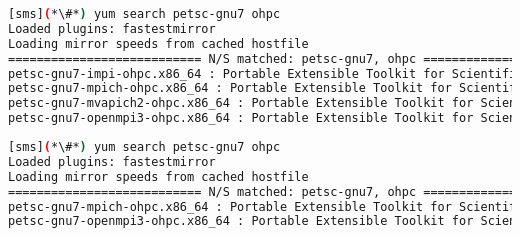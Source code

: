 \begin{lstlisting}[language=bash,keywords={}]
[sms](*\#*) yum search petsc-gnu7 ohpc
Loaded plugins: fastestmirror
Loading mirror speeds from cached hostfile
=========================== N/S matched: petsc-gnu7, ohpc ===========================
petsc-gnu7-impi-ohpc.x86_64 : Portable Extensible Toolkit for Scientific Computation
petsc-gnu7-mpich-ohpc.x86_64 : Portable Extensible Toolkit for Scientific Computation
petsc-gnu7-mvapich2-ohpc.x86_64 : Portable Extensible Toolkit for Scientific Computation
petsc-gnu7-openmpi3-ohpc.x86_64 : Portable Extensible Toolkit for Scientific Computation
\end{lstlisting}
\fi

\begin{lstlisting}[language=bash,keywords={}]
[sms](*\#*) yum search petsc-gnu7 ohpc
Loaded plugins: fastestmirror
Loading mirror speeds from cached hostfile
=========================== N/S matched: petsc-gnu7, ohpc ===========================
petsc-gnu7-mpich-ohpc.x86_64 : Portable Extensible Toolkit for Scientific Computation
petsc-gnu7-openmpi3-ohpc.x86_64 : Portable Extensible Toolkit for Scientific Computation
\end{lstlisting}
\fi

